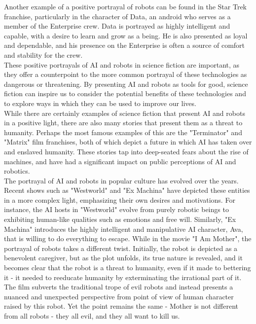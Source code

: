 \documentclass{article}
\begin{document}
Another example of a positive portrayal of robots can be found in the Star Trek franchise\cite{startrektng}, particularly in the character of Data, an android who serves as a member of the Enterprise crew. Data is portrayed as highly intelligent and capable, with a desire to learn and grow as a being. He is also presented as loyal and dependable, and his presence on the Enterprise is often a source of comfort and stability for the crew.\\

These positive portrayals of AI and robots in science fiction are important, as they offer a counterpoint to the more common portrayal of these technologies as dangerous or threatening. By presenting AI and robots as tools for good, science fiction can inspire us to consider the potential benefits of these technologies and to explore ways in which they can be used to improve our lives.\\

While there are certainly examples of science fiction that present AI and robots in a positive light, there are also many stories that present them as a threat to humanity. Perhaps the most famous examples of this are the "Terminator"\cite{cameron1984terminator} and "Matrix"\cite{wachowski1999matrix} film franchises, both of which depict a future in which AI has taken over and enslaved humanity. These stories tap into deep-seated fears about the rise of machines, and have had a significant impact on public perceptions of AI and robotics.\\

The portrayal of AI and robots in popular culture has evolved over the years. Recent shows such as "Westworld"\cite{westworld} and "Ex Machina"\cite{exmachina} have depicted these entities in a more complex light, emphasizing their own desires and motivations. For instance, the AI hosts in "Westworld" evolve from purely robotic beings to exhibiting human-like qualities such as emotions and free will. Similarly, "Ex Machina" introduces the highly intelligent and manipulative AI character, Ava, that is willing to do everything to escape. While in the movie "I Am Mother"\cite{i_am_mother}, the portrayal of robots takes a different twist. Initially, the robot is depicted as a benevolent caregiver, but as the plot unfolds, its true nature is revealed, and it becomes clear that the robot is a threat to humanity, even if it made to bettering it - it needed to reeducate humanity by exterminating the irrational part of it. The film subverts the traditional trope of evil robots and instead presents a nuanced and unexpected perspective from point of view of human character raised by this robot. Yet the point remains the same - Mother is not different from all robots - they all evil, and they all want to kill us.\\
\end{document}
